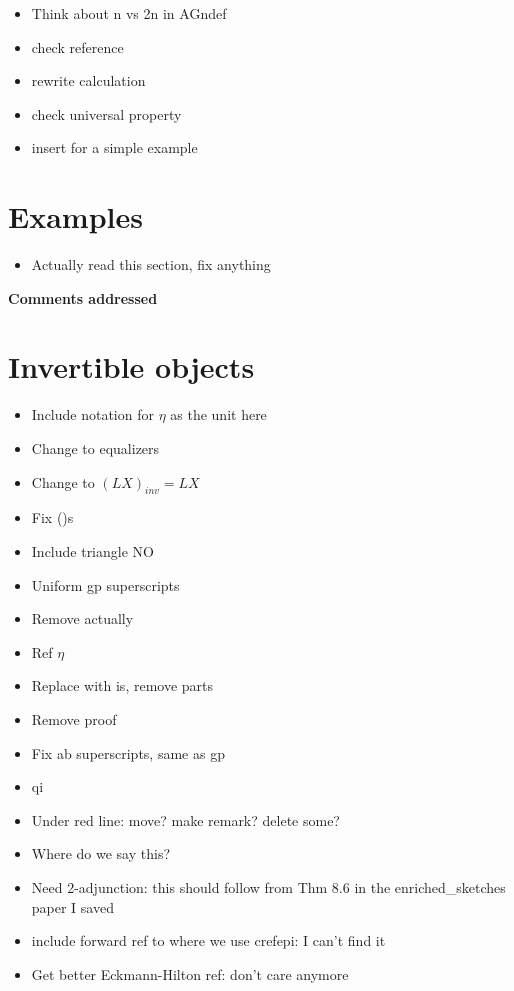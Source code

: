 \documentclass{amsart}
\begin{document}
\begin{itemize}


\item Think about n vs 2n in {AGndef}
\item check reference
\item rewrite calculation
\item check universal property
\item insert for a simple example
\end{itemize}



\section{Examples}

\begin{itemize}
\item Actually read this section, fix anything
\end{itemize}
\newpage

\begin{center}
\begin{Large}
\textbf{Comments addressed}
\end{Large}
\end{center}
\vskip1cm


\section{Invertible objects}
\begin{itemize}
\item Include notation for $\eta$ as the unit here
\item Change to equalizers
\item Change to $(LX)_{inv} = LX$
\item Fix ()s
\item Include triangle NO
\item Uniform gp superscripts
\item Remove actually
\item Ref $\eta$
\item Replace with is, remove parts
\item Remove proof
\item Fix ab superscripts, same as gp
\item qi
\item Under red line: move? make remark? delete some?
\item Where do we say this?
\item Need 2-adjunction: this should follow from Thm 8.6 in the enriched\_sketches paper I saved
\item include forward ref to where we use cref{epi}: I can't find it
\item Get better Eckmann-Hilton ref: don't care anymore
\end{itemize}
\end{document}
